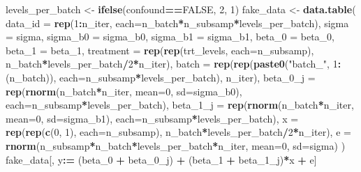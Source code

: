 \documentclass[]{book}
\newenvironment{Shaded}{\begin{snugshade}}{\end{snugshade}}
\newcommand{\DataTypeTok}[1]{\textcolor[rgb]{0.13,0.29,0.53}{#1}}
\newcommand{\DecValTok}[1]{\textcolor[rgb]{0.00,0.00,0.81}{#1}}
\newcommand{\ErrorTok}[1]{\textcolor[rgb]{0.64,0.00,0.00}{\textbf{#1}}}
\newcommand{\KeywordTok}[1]{\textcolor[rgb]{0.13,0.29,0.53}{\textbf{#1}}}
\newcommand{\NormalTok}[1]{#1}
\newcommand{\OperatorTok}[1]{\textcolor[rgb]{0.81,0.36,0.00}{\textbf{#1}}}
\newcommand{\OtherTok}[1]{\textcolor[rgb]{0.56,0.35,0.01}{#1}}
\newcommand{\StringTok}[1]{\textcolor[rgb]{0.31,0.60,0.02}{#1}}
\begin{document}
\begin{Shaded}
\begin{Highlighting}[]
\NormalTok{  levels_per_batch <-}\StringTok{ }\KeywordTok{ifelse}\NormalTok{(confound}\OperatorTok{==}\OtherTok{FALSE}\NormalTok{, }\DecValTok{2}\NormalTok{, }\DecValTok{1}\NormalTok{)}
\NormalTok{  fake_data <-}\StringTok{ }\KeywordTok{data.table}\NormalTok{(}
    \DataTypeTok{data_id =} \KeywordTok{rep}\NormalTok{(}\DecValTok{1}\OperatorTok{:}\NormalTok{n_iter, }\DataTypeTok{each=}\NormalTok{n_batch}\OperatorTok{*}\NormalTok{n_subsamp}\OperatorTok{*}\NormalTok{levels_per_batch),}
    \DataTypeTok{sigma =}\NormalTok{ sigma,}
    \DataTypeTok{sigma_b0 =}\NormalTok{ sigma_b0,}
    \DataTypeTok{sigma_b1 =}\NormalTok{ sigma_b1,}
    \DataTypeTok{beta_0 =}\NormalTok{ beta_}\DecValTok{0}\NormalTok{,}
    \DataTypeTok{beta_1 =}\NormalTok{ beta_}\DecValTok{1}\NormalTok{,}
    \DataTypeTok{treatment =} \KeywordTok{rep}\NormalTok{(}\KeywordTok{rep}\NormalTok{(trt_levels, }\DataTypeTok{each=}\NormalTok{n_subsamp), n_batch}\OperatorTok{*}\NormalTok{levels_per_batch}\OperatorTok{/}\DecValTok{2}\OperatorTok{*}\NormalTok{n_iter),}
    \DataTypeTok{batch =} \KeywordTok{rep}\NormalTok{(}\KeywordTok{rep}\NormalTok{(}\KeywordTok{paste0}\NormalTok{(}\StringTok{"batch_"}\NormalTok{, }\DecValTok{1}\OperatorTok{:}\NormalTok{(n_batch)), }\DataTypeTok{each=}\NormalTok{n_subsamp}\OperatorTok{*}\NormalTok{levels_per_batch), n_iter),}
    \DataTypeTok{beta_0_j =} \KeywordTok{rep}\NormalTok{(}\KeywordTok{rnorm}\NormalTok{(n_batch}\OperatorTok{*}\NormalTok{n_iter, }\DataTypeTok{mean=}\DecValTok{0}\NormalTok{, }\DataTypeTok{sd=}\NormalTok{sigma_b0), }\DataTypeTok{each=}\NormalTok{n_subsamp}\OperatorTok{*}\NormalTok{levels_per_batch),}
    \DataTypeTok{beta_1_j =} \KeywordTok{rep}\NormalTok{(}\KeywordTok{rnorm}\NormalTok{(n_batch}\OperatorTok{*}\NormalTok{n_iter, }\DataTypeTok{mean=}\DecValTok{0}\NormalTok{, }\DataTypeTok{sd=}\NormalTok{sigma_b1), }\DataTypeTok{each=}\NormalTok{n_subsamp}\OperatorTok{*}\NormalTok{levels_per_batch),}
    \DataTypeTok{x =} \KeywordTok{rep}\NormalTok{(}\KeywordTok{rep}\NormalTok{(}\KeywordTok{c}\NormalTok{(}\DecValTok{0}\NormalTok{, }\DecValTok{1}\NormalTok{), }\DataTypeTok{each=}\NormalTok{n_subsamp), n_batch}\OperatorTok{*}\NormalTok{levels_per_batch}\OperatorTok{/}\DecValTok{2}\OperatorTok{*}\NormalTok{n_iter),}
    \DataTypeTok{e =} \KeywordTok{rnorm}\NormalTok{(n_subsamp}\OperatorTok{*}\NormalTok{n_batch}\OperatorTok{*}\NormalTok{levels_per_batch}\OperatorTok{*}\NormalTok{n_iter, }\DataTypeTok{mean=}\DecValTok{0}\NormalTok{, }\DataTypeTok{sd=}\NormalTok{sigma)}
\NormalTok{  )}
\NormalTok{  fake_data[, y}\OperatorTok{:}\ErrorTok{=}\StringTok{ }\NormalTok{(beta_}\DecValTok{0} \OperatorTok{+}\StringTok{ }\NormalTok{beta_}\DecValTok{0}\NormalTok{_j) }\OperatorTok{+}\StringTok{ }\NormalTok{(beta_}\DecValTok{1} \OperatorTok{+}\StringTok{ }\NormalTok{beta_}\DecValTok{1}\NormalTok{_j)}\OperatorTok{*}\NormalTok{x }\OperatorTok{+}\StringTok{ }\NormalTok{e]}

\end{Highlighting}
\end{Shaded}
\end{document}
